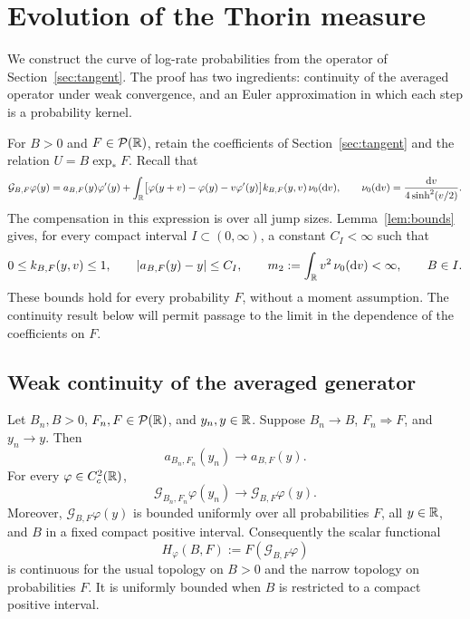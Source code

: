 \section{Evolution of the Thorin measure}
\label{sec:evolution}

We construct the curve of log-rate probabilities from the operator of Section~\ref{sec:tangent}.
The proof has two ingredients: continuity of the averaged operator under weak convergence, and an Euler approximation in which each step is a probability kernel.

For \(B>0\) and \(F\in\mathcal P(\mathbb R)\), retain the coefficients of Section~\ref{sec:tangent} and the relation \(U=B\exp_*F\).
Recall that
\begin{equation}
 \mathcal G_{B,F}\varphi(y)
 =a_{B,F}(y)\varphi'(y)
  +\int_{\mathbb R}\bigl[
       \varphi(y+v)-\varphi(y)-v\varphi'(y)
    \bigr]k_{B,F}(y,v)\,\nu_0(\mathop{}\!\mathrm d v),
 \qquad
 \nu_0(\mathop{}\!\mathrm d v)=\frac{\mathop{}\!\mathrm d v}{4\sinh^2(v/2)}.
 \label{eq:evolution-generator}
\end{equation}
The compensation in this expression is over all jump sizes.
Lemma~\ref{lem:bounds} gives, for every compact interval \(I\subset(0,\infty)\), a constant \(C_I<\infty\) such that
\begin{equation}
 0\le k_{B,F}(y,v)\le1,\qquad
 |a_{B,F}(y)-y|\le C_I,\qquad
 m_2:=\int_{\mathbb R}v^2\,\nu_0(\mathop{}\!\mathrm d v)<\infty,
 \qquad B\in I.
 \label{eq:evolution-uniform-bounds}
\end{equation}
These bounds hold for every probability \(F\), without a moment assumption.
The continuity result below will permit passage to the limit in the dependence of the coefficients on \(F\).

\subsection{Weak continuity of the averaged generator}

\begin{lemma}\label{lem:continuity}
Let \(B_n,B>0\), \(F_n,F\in\mathcal P(\mathbb R)\), and \(y_n,y\in\mathbb R\).
Suppose \(B_n\to B\), \(F_n\Rightarrow F\), and \(y_n\to y\).
Then
\[
 a_{B_n,F_n}(y_n)\longrightarrow a_{B,F}(y).
 \]
For every \(\varphi\in C_c^2(\mathbb R)\),
\begin{equation}
 \mathcal G_{B_n,F_n}\varphi(y_n)
   \longrightarrow\mathcal G_{B,F}\varphi(y).
 \label{eq:generator-joint-continuity}
\end{equation}
Moreover, \(\mathcal G_{B,F}\varphi(y)\) is bounded uniformly over all probabilities \(F\), all \(y\in\mathbb R\), and \(B\) in a fixed compact positive interval.
Consequently the scalar functional
\begin{equation}
 H_\varphi(B,F):=F(\mathcal G_{B,F}\varphi)
 \label{eq:averaged-generator-functional}
\end{equation}
is continuous for the usual topology on \(B>0\) and the narrow topology on probabilities \(F\).
It is uniformly bounded when \(B\) is restricted to a compact positive interval.
\end{lemma}

